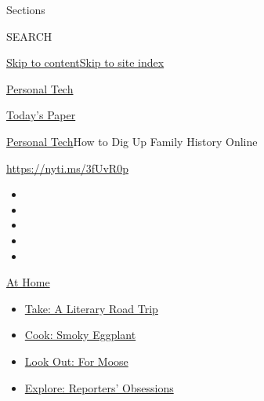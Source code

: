 Sections

SEARCH

\protect\hyperlink{site-content}{Skip to
content}\protect\hyperlink{site-index}{Skip to site index}

\href{https://www.nytimes3xbfgragh.onion/section/technology/personaltech}{Personal
Tech}

\href{https://myaccount.nytimes3xbfgragh.onion/auth/login?response_type=cookie\&client_id=vi}{}

\href{https://www.nytimes3xbfgragh.onion/section/todayspaper}{Today's
Paper}

\href{/section/technology/personaltech}{Personal Tech}\textbar{}How to
Dig Up Family History Online

\url{https://nyti.ms/3fUvR0p}

\begin{itemize}
\item
\item
\item
\item
\item
\end{itemize}

\href{https://www.nytimes3xbfgragh.onion/spotlight/at-home?action=click\&pgtype=Article\&state=default\&region=TOP_BANNER\&context=at_home_menu}{At
Home}

\begin{itemize}
\tightlist
\item
  \href{https://www.nytimes3xbfgragh.onion/2020/07/28/books/time-for-a-literary-road-trip.html?action=click\&pgtype=Article\&state=default\&region=TOP_BANNER\&context=at_home_menu}{Take:
  A Literary Road Trip}
\item
  \href{https://www.nytimes3xbfgragh.onion/2020/07/29/magazine/bored-with-your-home-cooking-some-smoky-eggplant-will-fix-that.html?action=click\&pgtype=Article\&state=default\&region=TOP_BANNER\&context=at_home_menu}{Cook:
  Smoky Eggplant}
\item
  \href{https://www.nytimes3xbfgragh.onion/2020/07/27/travel/moose-michigan-isle-royale.html?action=click\&pgtype=Article\&state=default\&region=TOP_BANNER\&context=at_home_menu}{Look
  Out: For Moose}
\item
  \href{https://www.nytimes3xbfgragh.onion/interactive/2020/at-home/even-more-reporters-editors-diaries-lists-recommendations.html?action=click\&pgtype=Article\&state=default\&region=TOP_BANNER\&context=at_home_menu}{Explore:
  Reporters' Obsessions}
\end{itemize}


